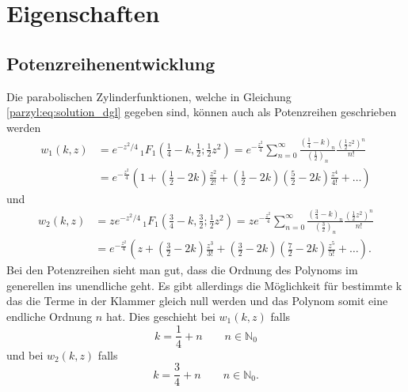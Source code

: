 %
%
%
\section{Eigenschaften
\label{parzyl:section:Eigenschaften}}

\subsection{Potenzreihenentwicklung
	\label{parzyl:potenz}}
Die parabolischen Zylinderfunktionen, welche in Gleichung \ref{parzyl:eq:solution_dgl} gegeben sind, können auch als Potenzreihen geschrieben werden
\begin{align}
	w_1(k,z)
	&=  
	e^{-z^2/4} \,
	{}_{1} F_{1}
	(
	{\textstyle \frac{1}{4}} 
	- k, {\textstyle \frac{1}{2}} ; {\textstyle \frac{1}{2}}z^2) 
	= 
	e^{-\frac{z^2}{4}}
	\sum^{\infty}_{n=0}
	\frac{\left ( \frac{1}{4} - k \right )_{n}}{\left ( \frac{1}{2}\right )_{n}}
	\frac{\left ( \frac{1}{2} z^2\right )^n}{n!} \\
	&=
	e^{-\frac{z^2}{4}}
	\left ( 
	1 
	+
	\left ( \frac{1}{2} - 2k \right )\frac{z^2}{2!}
	+
	\left ( \frac{1}{2} - 2k \right )\left ( \frac{5}{2} - 2k \right )\frac{z^4}{4!}  
	+
	\dots
	\right )
\end{align}
und
\begin{align}
	w_2(k,z)
	&=  
	ze^{-z^2/4} \,
	{}_{1} F_{1}
	(
	{\textstyle \frac{3}{4}} 
	- k, {\textstyle \frac{3}{2}} ; {\textstyle \frac{1}{2}}z^2) 
	= 
	ze^{-\frac{z^2}{4}}
	\sum^{\infty}_{n=0}
	\frac{\left ( \frac{3}{4} - k \right )_{n}}{\left ( \frac{3}{2}\right )_{n}}
	\frac{\left ( \frac{1}{2} z^2\right )^n}{n!} \\
	&=
	e^{-\frac{z^2}{4}}
	\left ( 
	z 
	+
	\left ( \frac{3}{2} - 2k \right )\frac{z^3}{3!}
	+
	\left ( \frac{3}{2} - 2k \right )\left ( \frac{7}{2} - 2k \right )\frac{z^5}{5!}  
	+
	\dots
	\right ).
\end{align}
Bei den Potenzreihen sieht man gut, dass die Ordnung des Polynoms im generellen ins unendliche geht. Es gibt allerdings die Möglichkeit für bestimmte k das die Terme in der Klammer gleich null werden und das Polynom somit eine endliche Ordnung $n$ hat. Dies geschieht bei $w_1(k,z)$ falls
\begin{equation}
	k = \frac{1}{4} + n \qquad n \in \mathbb{N}_0
\end{equation}
und bei $w_2(k,z)$ falls
\begin{equation}
	k = \frac{3}{4} + n \qquad n \in \mathbb{N}_0.
\end{equation}

